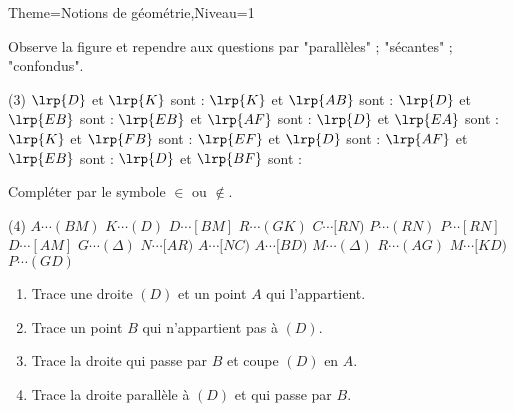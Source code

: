 \documentclass[a4paper,12pt]{article}
\begin{document}
\begin{Maquette}[Fiche]{Theme=Notions de géométrie,Niveau=1}

\begin{exercice}
Observe la figure et rependre aux questions par "parallèles" ; "sécantes" ; "confondus".
\begin{tasks}(3)
\task $\lrp{D}$ et $\lrp{K}$ sont :
\task $\lrp{K}$ et $\lrp{AB}$ sont :
\task $\lrp{D}$ et $\lrp{EB}$ sont :
\task $\lrp{EB}$ et $\lrp{AF}$ sont :
\task $\lrp{D}$ et $\lrp{EA}$ sont :
\task $\lrp{K}$ et $\lrp{FB}$ sont :
\task $\lrp{EF}$ et $\lrp{D}$ sont :
\task $\lrp{AF}$ et $\lrp{EB}$ sont :
\task $\lrp{D}$ et $\lrp{BF}$ sont :
\end{tasks}
\end{exercice}

\begin{exercice}
Compléter par le symbole $\in$ ou $\notin$.
\begin{tasks}(4)
\task $A \cdots (BM) $
\task $K \cdots (D) $
\task $D \cdots [BM] $
\task $R \cdots (GK) $
\task $C \cdots [RN) $
\task $P \cdots (RN) $
\task $P \cdots [RN] $
\task $D \cdots [AM] $
\task $G \cdots (\Delta) $
\task $N \cdots [AR) $
\task $A \cdots [NC) $
\task $A \cdots [BD) $
\task $M \cdots (\Delta) $
\task $R \cdots (AG) $
\task $M \cdots [KD) $
\task $P \cdots (GD) $
\end{tasks}
\end{exercice}

\begin{exercice}
\begin{enumerate}
\item Trace une droite $(D)$ et un point $A$ qui l'appartient.
\item Trace un point $B$ qui n'appartient pas à $(D)$.
\item Trace la droite qui passe par $B$ et coupe $(D)$ en $A$.
\item Trace la droite  parallèle à $(D)$ et qui passe par $B$.
\end{enumerate}
\end{exercice}


\end{Maquette}
\end{document}
